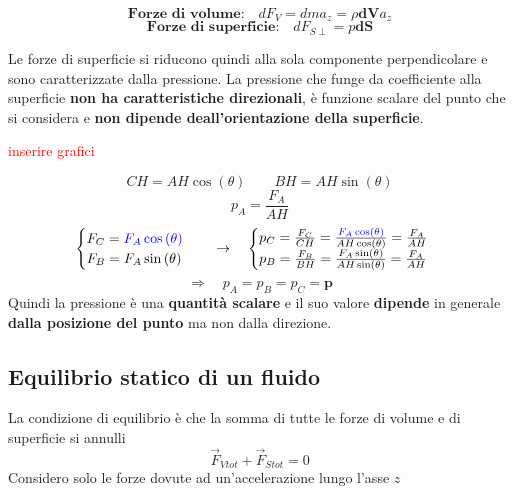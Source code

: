 \documentclass[x11names]{report}
\begin{document}
	\[ 
	\textbf{Forze di volume:} \quad dF_V = dma_z = \rho \boldsymbol{dV}a_z
	\]
	\[ 
	\textbf{Forze di superficie:} \quad dF_{S\perp} = p\boldsymbol{dS}
	\]
	
	\noindent
	Le forze di superficie si riducono quindi alla sola componente perpendicolare e sono caratterizzate dalla pressione. La pressione che funge da coefficiente alla superficie \textbf{non ha caratteristiche direzionali}, è funzione scalare del punto che si considera e \textbf{non dipende deall'orientazione della superficie}.
	
	\begin{center}
		\textcolor{red}{inserire grafici}
	\end{center}
	\[ 
	\boxed{CH = AH \cos\left(\theta\right)} \qquad \boxed{BH = AH \sin\left(\theta\right)}
	\]
	\[ 
	p_A = \frac{F_A}{AH}
	\]
	\[ 
	\begin{cases}
		F_C = \textcolor{blue}{F_A \cos\left(\theta\right)}\\
		F_B = F_A \sin\left(\theta\right)
	\end{cases} \quad \to \quad
	\begin{cases}
		p_C = \frac{F_C}{CH} = \frac{\textcolor{blue}{F_A \cos\left(\theta\right)}}{AH \cos\left(\theta\right)} = \frac{F_A}{AH} \\
		p_B = \frac{F_B}{BH} = \frac{F_A \sin\left(\theta\right)}{AH \sin\left(\theta\right)} = \frac{F_A}{AH}
	\end{cases}
	\]
	\[ 
	\Longrightarrow\quad p_A = p_B = p_C =\boldsymbol{p}
	\]
	Quindi la pressione è una \textbf{quantità scalare} e il suo valore \textbf{dipende} in generale \textbf{dalla posizione del punto} ma non dalla direzione.
	
	
		\subsection{Equilibrio statico di un fluido}
		La condizione di equilibrio è che la somma di tutte le forze di volume e di superficie si annulli
		\[ 
		\overrightarrow{F}_{Vtot} + \overrightarrow{F}_{Stot} = 0
		\]
		Considero solo le forze dovute ad un'accelerazione lungo l'asse \(z\)
		
\end{document}
